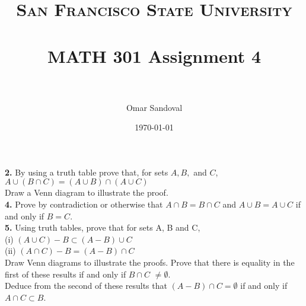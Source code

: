 \documentclass[paper=letter, fontsize=11pt]{scrartcl} %
\title{	
\normalfont \normalsize 
\textsc{San Francisco State University} \\ [25pt]
\horrule{0.5pt} \\[0.4cm] %
\huge MATH 301 Assignment 4  \\ %
\horrule{2pt} \\[0.5cm] %
}
\author{Omar Sandoval}
\date{\normalsize\today}
\begin{document}
\maketitle

\textbf{2.} By using a truth table prove that, for sets $A, B,$ and $C$,\\
$A \cup ( B \cap C ) = ( A \cup B ) \cap ( A \cup C )$ \\
Draw a Venn diagram to illustrate the proof. \\

\textbf{4.} Prove by contradiction or otherwise that $A \cap B = B \cap C$ and $ A \cup B
 = A \cup C$ if and only if $B = C$. \\

\textbf{5.} Using truth tables, prove that for sets A, B and C, \\
(i) $(A \cup C) - B \subset (A - B) \cup C$ \\
(ii) $(A \cap C) - B = (A - B) \cap C$ \\

Draw Venn diagrams to illustrate the proofs.
Prove that there is equality in the first of these results if and only if $B \cap C$
 $\not= \emptyset$. \\
Deduce from the second of these results that $(A-B)\cap C = \emptyset$ if and only if
 $A \cap C \subset B$.


\end{document}
